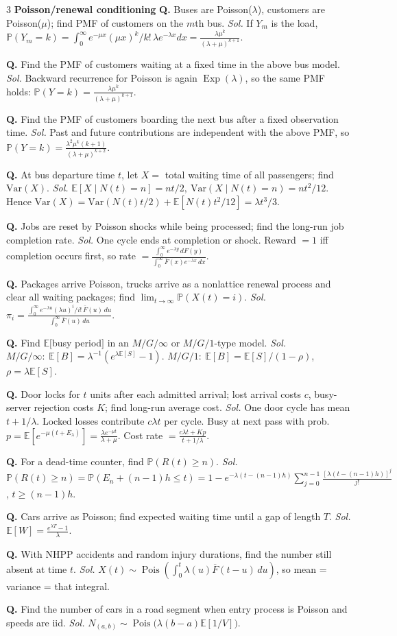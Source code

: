 \documentclass[a4paper,8pt,fleqn]{extarticle}
\newcommand{\E}{\mathbb{E}}
\newcommand{\PP}{\mathbb{P}}
\newcommand{\Var}{\mathrm{Var}}
\newcommand{\1}{\mathbf{1}}
\newcommand{\barF}{\overline{F}}
\newcommand{\sub}[1]{\textbf{#1} }
\newcommand{\probq}[2]{\textbf{Q.} #1 \emph{Sol.} #2\par}
\DeclareMathOperator{\Pois}{Pois}
\DeclareMathOperator{\Exp}{Exp}
\begin{document}
\begin{multicols}{3}
\sub{Poisson/renewal conditioning}
\probq{Buses are Poisson(\(\lambda\)), customers are Poisson(\(\mu\)); find PMF of customers on the \(m\)th bus.}{If \(Y_m\) is the load, \(\PP(Y_m=k)=\int_0^\infty e^{-\mu x}(\mu x)^k/k!\,\lambda e^{-\lambda x}dx=\frac{\lambda\mu^k}{(\lambda+\mu)^{k+1}}\).}
\probq{Find the PMF of customers waiting at a fixed time in the above bus model.}{Backward recurrence for Poisson is again \(\Exp(\lambda)\), so the same PMF holds: \(\PP(Y=k)=\frac{\lambda\mu^k}{(\lambda+\mu)^{k+1}}\).}
\probq{Find the PMF of customers boarding the next bus after a fixed observation time.}{Past and future contributions are independent with the above PMF, so \(\PP(Y=k)=\frac{\lambda^2\mu^k(k+1)}{(\lambda+\mu)^{k+2}}\).}
\probq{At bus departure time \(t\), let \(X=\) total waiting time of all passengers; find \(\Var(X)\).}{\(\E[X\mid N(t)=n]=nt/2,\ \Var(X\mid N(t)=n)=nt^2/12\). Hence \(\Var(X)=\Var(N(t)t/2)+\E[N(t)t^2/12]=\lambda t^3/3\).}
\probq{Jobs are reset by Poisson shocks while being processed; find the long-run job completion rate.}{One cycle ends at completion or shock. Reward \(=1\) iff completion occurs first, so rate \(=\frac{\int_0^\infty e^{-\lambda y}\,dF(y)}{\int_0^\infty \barF(x)e^{-\lambda x}\,dx}\).}
\probq{Packages arrive Poisson, trucks arrive as a nonlattice renewal process and clear all waiting packages; find \(\lim_{t\to\infty}\PP(X(t)=i)\).}{\(\displaystyle \pi_i=\frac{\int_0^\infty e^{-\lambda u}(\lambda u)^i/i!\,\barF(u)\,du}{\int_0^\infty \barF(u)\,du}\).}
\probq{Find \(\E[\)busy period\(]\) in an \(M/G/\infty\) or \(M/G/1\)-type model.}{\(M/G/\infty:\ \E[B]=\lambda^{-1}(e^{\lambda\E[S]}-1)\). \(M/G/1:\ \E[B]=\E[S]/(1-\rho)\), \(\rho=\lambda\E[S]\).}
\probq{Door locks for \(t\) units after each admitted arrival; lost arrival costs \(c\), busy-server rejection costs \(K\); find long-run average cost.}{One door cycle has mean \(t+1/\lambda\). Locked losses contribute \(c\lambda t\) per cycle. Busy at next pass with prob.\ \(p=\E[e^{-\mu(t+E_\lambda)}]=\frac{\lambda e^{-\mu t}}{\lambda+\mu}\). Cost rate \(=\frac{c\lambda t+Kp}{t+1/\lambda}\).}
\probq{For a dead-time counter, find \(\PP(R(t)\ge n)\).}{\(\displaystyle \PP(R(t)\ge n)=\PP(E_n+(n-1)h\le t)=1-e^{-\lambda(t-(n-1)h)}\sum_{j=0}^{n-1}\frac{[\lambda(t-(n-1)h)]^j}{j!}\), \(t\ge(n-1)h\).}
\probq{Cars arrive as Poisson; find expected waiting time until a gap of length \(T\).}{\(\displaystyle \E[W]=\frac{e^{\lambda T}-1}{\lambda}\).}
\probq{With NHPP accidents and random injury durations, find the number still absent at time \(t\).}{\(\displaystyle X(t)\sim\Pois\!\left(\int_0^t \lambda(u)\barF(t-u)\,du\right)\), so mean = variance = that integral.}
\probq{Find the number of cars in a road segment when entry process is Poisson and speeds are iid.}{\(\displaystyle N_{(a,b)}\sim\Pois\!\big(\lambda(b-a)\E[1/V]\big)\).}


\end{multicols}
\end{document}

